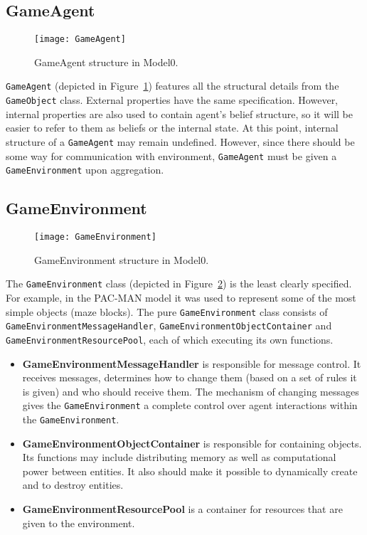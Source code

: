 \subsection{GameAgent}
  \begin{figure}[p]
    \begin{center}
      \texttt{[image: GameAgent]}
      \caption{GameAgent structure in Model0.}
      \label{GameAg}
     \end{center}
    \end{figure}
\texttt{GameAgent} (depicted in Figure~\ref{GameAg}) features all the structural details from the \texttt{GameObject} class.
External properties have the same specification. However, internal properties are also used to contain agent's belief structure, so it will be easier to refer to them as beliefs or the internal state. At this point, internal structure of a \texttt{GameAgent} may remain undefined. However, since there should be some way for communication with environment, \texttt{GameAgent} must be given a \texttt{GameEnvironment} upon aggregation.

\subsection{GameEnvironment}
 \begin{figure}[p]
    \begin{center}
      \texttt{[image: GameEnvironment]}
      \caption{GameEnvironment structure in Model0.}
      \label{GameEnv}
     \end{center}
    \end{figure}
The \texttt{GameEnvironment} class (depicted in Figure~\ref{GameEnv}) is the least clearly specified. For example, in the PAC-MAN model it was used to represent some of the most simple objects (maze blocks). The pure \texttt{GameEnvironment} class consists of \texttt{GameEnvironmentMessageHandler}, \texttt{GameEnvironmentObjectContainer} and \texttt{GameEnvironmentResourcePool}, each of which executing its own functions.
\begin{itemize}
\item \textbf{GameEnvironmentMessageHandler} is responsible for message control. It receives messages, determines how to change them (based on a set of rules it is given) and who should receive them. The mechanism of changing messages gives the \texttt{GameEnvironment} a complete control over agent interactions within the \texttt{GameEnvironment}.
\item \textbf{GameEnvironmentObjectContainer} is responsible for containing objects. Its functions may include distributing memory as well as computational power between entities. It also should make it possible to dynamically create and to destroy entities.
\item \textbf{GameEnvironmentResourcePool} is a container for resources that are given to the environment.
\end{itemize}
